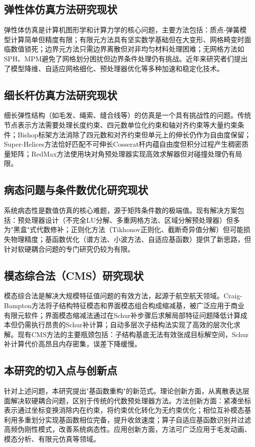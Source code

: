 \subsection{弹性体仿真方法研究现状}

弹性体仿真是计算机图形学和计算力学的核心问题，主要方法包括：质点-弹簧模型计算简单但精度有限；有限元方法具有坚实数学基础但在大变形、网格畸变时面临数值锁死；边界元方法只需边界离散但对非均匀材料处理困难；无网格方法如SPH、MPM避免了网格划分困扰但边界条件处理仍有挑战。近年来研究者们提出了模型降维、自适应网格细化、预处理器优化等多种加速和稳定化技术。

\subsection{细长杆仿真方法研究现状}

细长弹性结构（如毛发、绳索、缝合线等）的仿真是一个具有挑战性的问题。传统节点表示方法需要处理长度约束、四元数单位化约束和轴对齐约束等大量约束条件；Bishop标架方法消除了四元数和对齐约束但单元上的伸长仍作为自由度保留；Super-Helices方法恰好匹配不可伸长Cosserat杆内蕴自由度但积分过程产生稠密质量矩阵；RedMax方法使用块对角预处理器实现高效求解器但对碰撞处理仍有局限。

\subsection{病态问题与条件数优化研究现状}

系统病态性是数值仿真的核心难题，源于矩阵条件数的极端值。现有解决方案包括：预处理器设计（不完全LU分解、多重网格方法、区域分解预处理器）但多为"黑盒"式代数修补；正则化方法（Tikhonov正则化、截断奇异值分解）但可能损失物理精度；基函数优化（谱方法、小波方法、自适应基函数）提供了新思路，但针对软硬耦合问题的专门研究仍较为有限。

\subsection{模态综合法（CMS）研究现状}

模态综合法是解决大规模特征值问题的有效方法，起源于航空航天领域。Craig-Bampton方法将子结构特征模态和界面模态组合构成缩减基，被广泛应用于商业有限元软件；界面模态缩减法通过在Schur补步骤后求解局部特征问题降低计算成本但仍需执行昂贵的Schur补计算；自动多层次子结构法实现了高效的层次化求解。现有CMS方法的主要瓶颈包括：子结构基底无法有效张成目标解空间，Schur补计算代价高昂且内存密集，误差下降缓慢。

\subsection{本研究的切入点与创新点}

针对上述问题，本研究提出"基函数重构"的新范式。理论创新方面，从离散表达层面解决软硬耦合问题，区别于传统的代数预处理器方法。方法创新方面：紧凑坐标表示通过坐标变换消除内在约束，将约束优化转化为无约束优化；相位互补模态基利用多重划分实现基函数相位完备，提升收敛速度；算子自适应基函数识别并过滤高频伪刚性模式，改善系统病态性。应用创新方面，方法可广泛应用于毛发动画、模态分析、有限元仿真等领域。